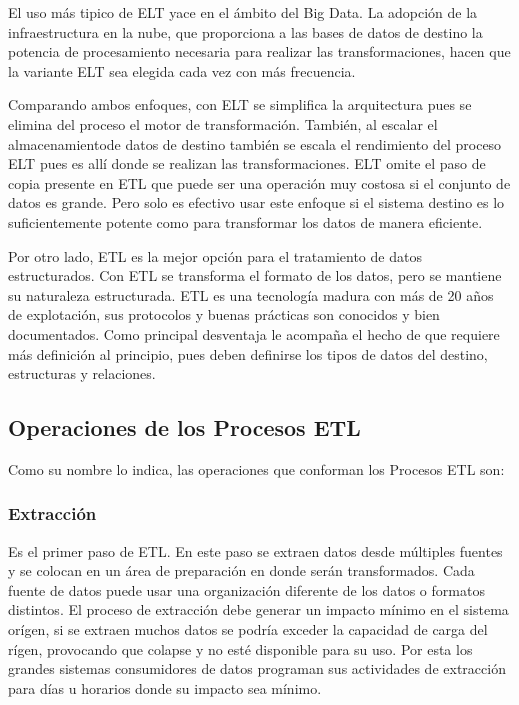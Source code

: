 El uso m\'as tipico de ELT yace en el \'ambito del Big Data\cite{raunakjhawar_ETL_microsoft}. La adopción de la 
infraestructura en la nube, que proporciona a las bases de datos de destino la potencia de procesamiento necesaria 
para realizar las transformaciones, hacen que la variante ELT sea elegida cada vez con m\'as frecuencia.

Comparando ambos enfoques, con ELT se simplifica la arquitectura pues se elimina del proceso el motor de transformación. 
Tambi\'en, al escalar el almacenamientode datos de destino también se escala el rendimiento del proceso ELT pues es all\'i
donde se realizan las transformaciones. ELT omite el paso de copia presente en ETL que puede ser una operaci\'on muy costosa 
si el conjunto de datos es grande. Pero solo es efectivo usar este enfoque si el sistema destino es lo suficientemente
potente como para transformar los datos de manera eficiente.

Por otro lado, ETL es la mejor opci\'on para el tratamiento de datos estructurados\cite{etl_vs_elt_amazon}. Con 
ETL se transforma el formato de los datos, pero se mantiene su naturaleza estructurada. ETL es una tecnología madura 
con m\'as de 20 años de explotaci\'on, sus protocolos y buenas pr\'acticas son conocidos y bien documentados. Como principal 
desventaja le acompaña el hecho de que requiere m\'as definici\'on al principio, pues deben definirse los tipos de datos 
del destino, estructuras y relaciones.

\subsection{Operaciones de los Procesos ETL}

Como su nombre lo indica, las operaciones que conforman los Procesos ETL son:

\subsubsection{Extracci\'on}

Es el primer paso de ETL. En este paso se extraen datos desde m\'ultiples fuentes y se colocan en un \'area de preparaci\'on 
en donde ser\'an transformados. Cada fuente de datos puede usar una organizaci\'on diferente de los datos o formatos distintos. 
El proceso de extracci\'on debe generar un impacto m\'inimo en el sistema or\'igen, si se extraen muchos datos se podr\'ia 
exceder la capacidad de carga del r\'igen, provocando que colapse y no est\'e disponible para su uso. Por esta los grandes 
sistemas consumidores de datos programan sus actividades de extracci\'on para d\'ias u horarios donde su impacto sea 
m\'inimo. 

